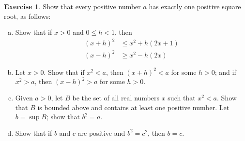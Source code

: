 \documentclass[11pt,a4paper,twoside]{article}
\theoremstyle{definition}
\newcounter{excounter}
\newtheorem{exercise}[excounter]{Exercise}
\begin{document}
\begin{exercise}

  Show that every positive number $a$ has exactly one positive square root, as follows:

  \begin{enumerate}[(a)]

  \item Show that if $x > 0$ and $0 \leq h < 1$, then
    \begin{align*}
      (x + h)^2 &\leq x^2 + h (2 x + 1) \\
      (x - h)^2 &\geq x^2 -h (2 x)
    \end{align*}

  \item Let $x > 0$. Show that if $x^2 < a$, then $(x + h)^2 < a$ for some $h > 0$; and if $x^2 > a$, then $(x - h)^2 > a$ for some $h > 0$.

  \item Given $a > 0$, let $B$ be the set of all real numbers $x$ such that $x^2 < a$. Show that $B$ is bounded above and contains at least one positive number.
    Let $b = \sup B$; show that $b^2 = a$.

  \item Show that if $b$ and $c$ are positive and $b^2 = c^2$, then $b = c$.

  \end{enumerate}

\end{exercise}
\end{document}
